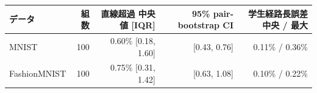 \begin{tabular}{lrrrr}
\toprule
データ & 組数 & 直線超過 中央値 [IQR] & 95\% pair-bootstrap CI & 学生経路長誤差 中央 / 最大 \\
\midrule
MNIST & 100 & 0.60\% [0.18, 1.60] & [0.43, 0.76] & 0.11\% / 0.36\% \\
FashionMNIST & 100 & 0.75\% [0.31, 1.42] & [0.63, 1.08] & 0.10\% / 0.22\% \\
\bottomrule
\end{tabular}
